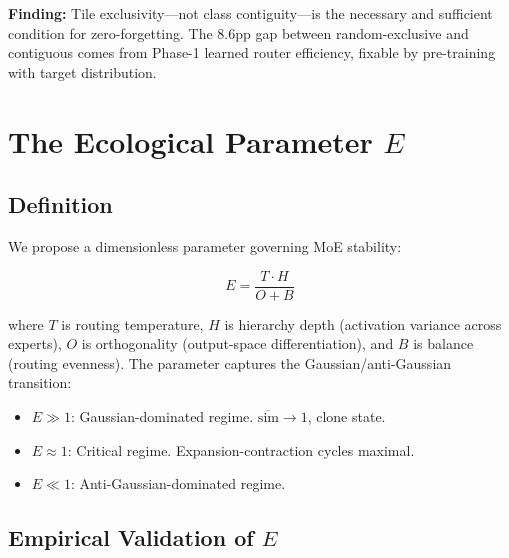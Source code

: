 \documentclass[twoside]{article}
\theoremstyle{definition}
\begin{document}
\textbf{Finding: } Tile exclusivity---not class contiguity---is the necessary and sufficient condition for zero-forgetting. The 8.6pp gap between random-exclusive and contiguous comes from Phase-1 learned router efficiency, fixable by pre-training with target distribution.

\section{The Ecological Parameter $E$}

\subsection{Definition}

We propose a dimensionless parameter governing MoE stability:

$$E = \frac{T \cdot H}{O + B}$$

where $T$ is routing temperature, $H$ is hierarchy depth (activation variance across experts), $O$ is orthogonality (output-space differentiation), and $B$ is balance (routing evenness). The parameter captures the Gaussian/anti-Gaussian transition:

\begin{itemize}
    \item $E \gg 1$: Gaussian-dominated regime. $\overline{\text{sim}} \to 1$, clone state.
    \item $E \approx 1$: Critical regime. Expansion-contraction cycles maximal.
    \item $E \ll 1$: Anti-Gaussian-dominated regime.
\end{itemize}

\subsection{Empirical Validation of $E$}

\begin{table}[ht]
\centering
\caption{Empirical $E$ values across configurations}
\end{table}
\end{document}
